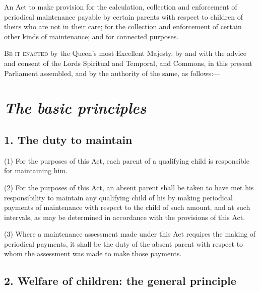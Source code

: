 \documentclass[12pt,a4paper]{article}
\title{\regstitle}
\author{1991 Chapter 48}
\date{Royal Assent 25th July 1991}
\begin{document}
\maketitle

\noindent
{\large An Act to make provision for the calculation, collection and enforcement of periodical maintenance payable by certain parents with respect to children of theirs who are not in their care; for the collection and enforcement of certain other kinds of maintenance; and for connected purposes.}

\bigskip

\lettrine{B}{e it enacted} by the Queen’s most Excellent Majesty, by and with the advice and consent of the Lords Spiritual and Temporal, and Commons, in this present Parliament assembled, and by the authority of the same, as follows:—


{\sloppy

\tableofcontents

}

\setcounter{secnumdepth}{-2}

\section{\itshape The basic principles}


\subsection{1. The duty to maintain}

(1) For the purposes of this Act, each parent of a qualifying child is responsible for maintaining him.

(2) For the purposes of this Act, an absent parent shall be taken to have met his responsibility to maintain any qualifying child of his by making periodical payments of maintenance with respect to the child of such amount, and at such intervals, as may be determined in accordance with the provisions of this Act.

(3) Where a maintenance assessment made under this Act requires the making of periodical payments, it shall be the duty of the absent parent with respect to whom the assessment was made to make those payments.

\subsection{2. Welfare of children: the general principle}
\end{document}

